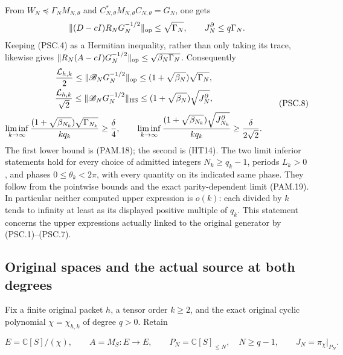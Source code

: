 From \(W_N\preceq\Gamma_NM_{N,\theta}\) and
\(C_{N,\theta}^*M_{N,\theta}C_{N,\theta}=G_N\), one gets
\[
 \|(D-cI)R_NG_N^{-1/2}\|_{\rm op}\le\sqrt{\Gamma_N},
 \qquad J_N^\partial\le q\Gamma_N .
\]
Keeping (PSC.4) as a Hermitian inequality, rather than only taking
its trace, likewise gives
\(\|R_N(A-cI)G_N^{-1/2}\|_{\rm op}
 \le\sqrt{\beta_N\Gamma_N}\).
Consequently
\[
 \begin{gathered}
 \frac{\mathcal L_{h,k}}2
 \le\|\mathscr B_NG_N^{-1/2}\|_{\rm op}
 \le(1+\sqrt{\beta_N})\sqrt{\Gamma_N},\\
 \frac{\mathcal L_{h,k}}{\sqrt2}
 \le\|\mathscr B_NG_N^{-1/2}\|_{\rm HS}
 \le(1+\sqrt{\beta_N})\sqrt{J_N^\partial},\\
 \liminf_{k\to\infty}
 \frac{(1+\sqrt{\beta_{N_k}})\sqrt{\Gamma_{N_k}}}{kq_k}
 \ge\frac{\delta}{4},\qquad
 \liminf_{k\to\infty}
 \frac{(1+\sqrt{\beta_{N_k}})\sqrt{J_{N_k}^\partial}}{kq_k}
 \ge\frac{\delta}{2\sqrt2}.
 \end{gathered}
 \tag{PSC.8}\label{CFStage:eq:psc-upperfloor}
\]
The first lower bound is (PAM.18); the second is (HT14).
The two limit inferior statements hold for every choice of
admitted integers \(N_k\ge q_k-1\), periods \(L_k>0\), and phases
\(0\le\theta_k<2\pi\), with every quantity on its indicated
same phase. They follow from the pointwise bounds and the exact
parity-dependent limit (PAM.19). In particular neither computed
upper expression is \(o(k)\): each divided by \(k\) tends to
infinity at least as its displayed positive multiple of \(q_k\).
This statement concerns the upper expressions actually linked
to the original generator by (PSC.1)--(PSC.7).


\subsection{Original spaces and the actual source at both degrees}

Fix a finite original packet \(h\), a tensor order \(k\geq2\), and the exact original cyclic polynomial \(\chi=\chi_{h,k}\) of degree \(q>0\). Retain

\[
 E=\mathbb C[S]/(\chi),\qquad A=M_S:E\longrightarrow E,
 \qquad P_N=\mathbb C[S]_{\leq N},\quad N\geq q-1,
 \qquad J_N=\pi_\chi|_{P_N}.
 \tag{PSC.9}
\]

